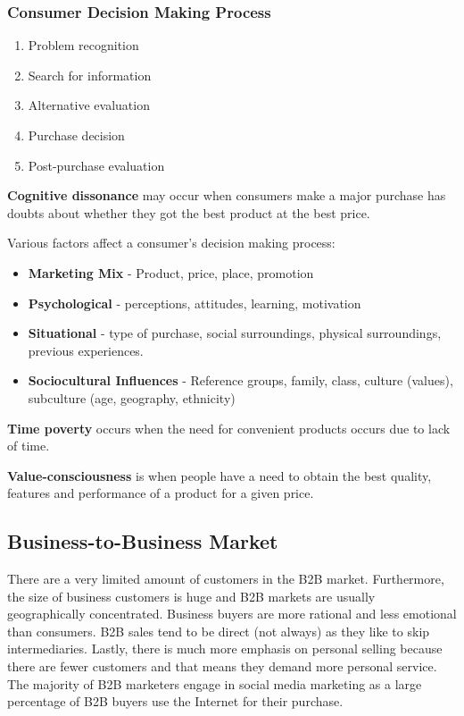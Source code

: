 \documentclass[english, 12pt]{article}
\begin{document}
\subsubsection*{Consumer Decision Making Process}
\begin{enumerate}
\item Problem recognition
\item Search for information
\item Alternative evaluation
\item Purchase decision
\item Post-purchase evaluation
\end{enumerate}
\begin{defn}
\textbf{Cognitive dissonance} may occur when consumers make a major purchase has doubts about whether they got the best product at the best price.
\end{defn}
Various factors affect a consumer's decision making process:
\begin{itemize}
\item \textbf{Marketing Mix} - Product, price, place, promotion
\item \textbf{Psychological} - perceptions, attitudes, learning, motivation
\item \textbf{Situational} - type of purchase, social surroundings, physical surroundings, previous experiences.
\item \textbf{Sociocultural Influences} - Reference groups, family, class, culture (values), subculture (age, geography, ethnicity)
\end{itemize}
\begin{defn}
\textbf{Time poverty} occurs when the need for convenient products occurs due to lack of time.
\end{defn}
\begin{defn}
\textbf{Value-consciousness} is when people have a need to obtain the best quality, features and performance of a product for a given price.
\end{defn}
\subsection{Business-to-Business Market}
There are a very limited amount of customers in the B2B market. Furthermore, the size of business customers is huge and B2B markets are usually geographically concentrated. Business buyers are more rational and less emotional than consumers. B2B sales tend to be direct (not always) as they like to skip intermediaries. Lastly, there is much more emphasis on personal selling because there are fewer customers and that means they demand more personal service. The majority of B2B marketers engage in social media marketing as a large percentage of B2B buyers use the Internet for their purchase.
\end{document}
